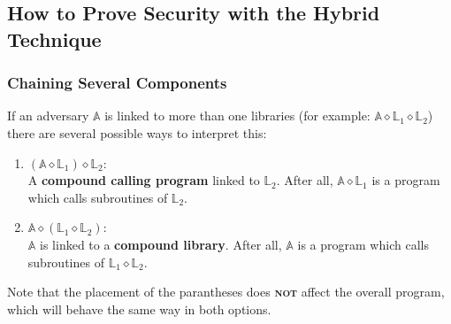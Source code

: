 \documentclass{article}
\begin{document}
\begin{adjustwidth}{2em}{}
\begin{adjustwidth}{2em}{}
			\end{adjustwidth}
			\subsection{How to Prove Security with the Hybrid Technique}
			\begin{adjustwidth}{2em}{}
				\subsubsection{Chaining Several Components}
				\begin{adjustwidth}{2em}{4em}
					If an adversary $\mathbb{A}$ is linked to more than one libraries (for example: $\mathbb{A} \diamond \mathbb{L}_1 \diamond \mathbb{L}_2$) there are several possible ways to interpret this:
					\begin{adjustwidth}{1em}{}
						\begin{enumerate}[-]
							\item $(\mathbb{A} \diamond \mathbb{L}_1) \diamond \mathbb{L}_2$: \\
							A \textbf{compound calling program} linked to $\mathbb{L}_2$. After all, $\mathbb{A} \diamond \mathbb{L}_1$ is a program which calls subroutines of $\mathbb{L}_2$.
							\item $\mathbb{A} \diamond (\mathbb{L}_1 \diamond \mathbb{L}_2)$: \\
							$\mathbb{A}$ is linked to a \textbf{compound library}. After all, $\mathbb{A}$ is a program which calls subroutines of $\mathbb{L}_1 \diamond \mathbb{L}_2$.
						\end{enumerate}
					\end{adjustwidth}
					Note that the placement of the parantheses does \textbf{\textsc{not}} affect the overall program, which will behave the same way in both options.
				\end{adjustwidth}

\end{adjustwidth}
\end{adjustwidth}
\end{document}
